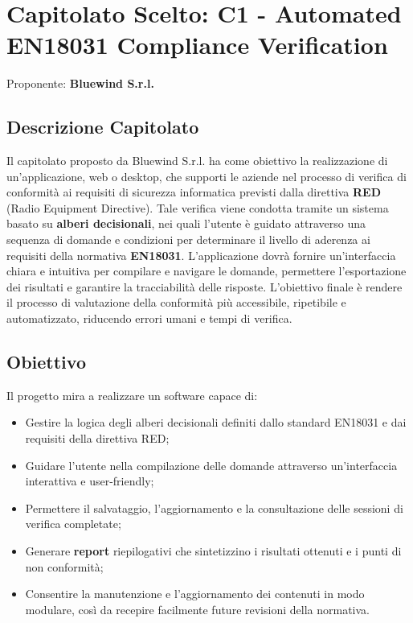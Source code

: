 \documentclass[a4paper,12pt]{article}
\begin{document}
\newpage

\tableofcontents

\newpage

\section{Capitolato Scelto: C1 - Automated EN18031 Compliance Verification}
    Proponente: \textbf{Bluewind S.r.l.}

    \subsection{Descrizione Capitolato}{
        Il capitolato proposto da Bluewind S.r.l. ha come obiettivo la realizzazione di un'applicazione, web o desktop, che supporti le aziende nel processo di verifica di conformità ai requisiti di sicurezza informatica previsti dalla direttiva \textbf{RED} (Radio Equipment Directive).
        Tale verifica viene condotta tramite un sistema basato su \textbf{alberi decisionali}, nei quali l'utente è guidato attraverso una sequenza di domande e condizioni per determinare il livello di aderenza ai requisiti della normativa \textbf{EN18031}.
        L'applicazione dovrà fornire un'interfaccia chiara e intuitiva per compilare e navigare le domande, permettere l'esportazione dei risultati e garantire la tracciabilità delle risposte.
        L’obiettivo finale è rendere il processo di valutazione della conformità più accessibile, ripetibile e automatizzato, riducendo errori umani e tempi di verifica.
    

    \subsection{Obiettivo}
        Il progetto mira a realizzare un software capace di:
        \begin{itemize}
            \item Gestire la logica degli alberi decisionali definiti dallo standard EN18031 e dai requisiti della direttiva RED;
            \item Guidare l’utente nella compilazione delle domande attraverso un’interfaccia interattiva e user-friendly;
            \item Permettere il salvataggio, l’aggiornamento e la consultazione delle sessioni di verifica completate;
            \item Generare \textbf{report} riepilogativi che sintetizzino i risultati ottenuti e i punti di non conformità;
            \item Consentire la manutenzione e l’aggiornamento dei contenuti in modo modulare, così da recepire facilmente future revisioni della normativa.
        \end{itemize}
    

}
\end{document}

